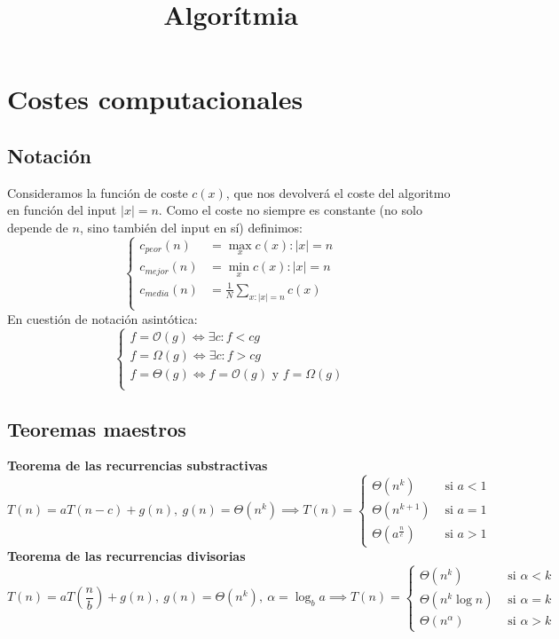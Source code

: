 \documentclass[leqno]{article}
\title{Algorítmia}
\begin{document}
\maketitle
\tableofcontents
\newpage

\section{Costes computacionales}
\subsection{Notación}
Consideramos la función de coste $c(x)$, que nos devolverá el coste del algoritmo en función del input $|x|=n$. Como el coste no siempre es constante (no solo depende de $n$, sino también del input en sí) definimos:
$$
\begin{cases}
c_{peor}(n) &= \max_x {c(x) : |x|=n} \\
c_{mejor}(n) &= \min_x {c(x) : |x|=n} \\
c_{media}(n) &= \frac{1}{N}\sum_{x:|x|=n} c(x) \\
\end{cases}
$$
En cuestión de notación asintótica:
$$
\begin{cases}
f = \mathcal{O}(g) \iff \exists c :f<cg \\ 
f = \Omega(g) \iff \exists c :f>cg \\ 
f = \Theta(g) \iff f=\mathcal{O}(g) \text{ y } f=\Omega(g) \\
\end{cases}
$$

\subsection{Teoremas maestros}
\textbf{Teorema de las recurrencias substractivas}
$$
T(n) = aT(n-c) + g(n), \ g(n) = \Theta(n^k) \implies T(n)=
\begin{cases}
\Theta(n^k) &\text{ si } a<1 \\
\Theta(n^{k+1}) &\text{ si } a=1 \\
\Theta(a^{\frac{n}{c}}) &\text{ si } a>1
\end{cases}
$$ \textbf{Teorema de las recurrencias divisorias}
$$
T(n) = aT\left(\frac{n}{b}\right) + g(n), \ g(n) = \Theta(n^k), \ \alpha = \log_ba \implies T(n)=
\begin{cases}
\Theta(n^k) &\text{ si } \alpha<k \\
\Theta(n^{k}\log n) &\text{ si } \alpha=k \\
\Theta(n^\alpha) &\text{ si } \alpha>k
\end{cases}
$$
\end{document}
